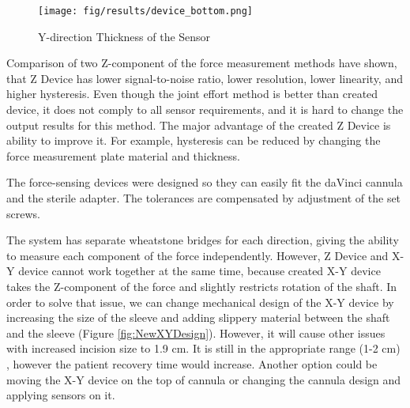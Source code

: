 \begin{figure}[h]
	\begin{center}
	\texttt{[image: fig/results/device\_bottom.png]}
	\end{center}
	\vspace{-4mm}
	\caption[Y-direction Thickness of the Sensor]
	{Y-direction Thickness of the Sensor}
	\label{fig:Syst_err_expl}
	\vspace{-2mm}
\end{figure}

	Comparison of two Z-component of the force measurement methods have shown, that Z Device has lower signal-to-noise ratio, lower resolution, lower linearity, and higher hysteresis. Even though the joint effort method is better than created device, it does not comply to all sensor requirements, and it is hard to change the output results for this method. The major advantage of the created Z Device is ability to improve it. For example, hysteresis can be reduced by changing the force measurement plate material and thickness.

The force-sensing devices were designed so they can easily fit the daVinci cannula and the sterile adapter. The tolerances are compensated by adjustment of the set screws.

The system has separate wheatstone bridges for each direction, giving the ability to measure each component of the force independently. However, Z Device and X-Y device cannot work together at the same time, because created X-Y device takes the Z-component of the force and slightly restricts rotation of the shaft. In order to solve that issue, we can change mechanical design of the X-Y device by increasing the size of the sleeve and adding slippery material between the shaft and the sleeve (Figure \ref{fig:NewXYDesign}). However, it will cause other issues with increased incision size to 1.9 cm. It is still in the appropriate range (1-2 cm) \cite{_laparoscopy}, however the patient recovery time would increase. Another option could be moving the X-Y device on the top of cannula or changing the cannula design and applying sensors on it.

